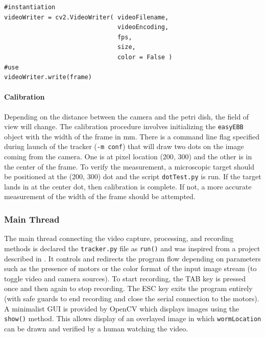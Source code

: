 \documentclass[main.tex]{subfiles}
\begin{document}
\begin{lstlisting}
#instantiation
videoWriter = cv2.VideoWriter( videoFilename, 
                               videoEncoding, 
                               fps, 
                               size, 
                               color = False )
#use
videoWriter.write(frame)
\end{lstlisting}

\paragraph{Calibration}
Depending on the distance between the camera and the petri dish, the field of view will change. The calibration procedure involves initializing the \verb|easyEBB| object with the width of the frame in mm. There is a command line flag specified during launch of the tracker (\verb|-m conf|) that will draw two dots on the image coming from the camera. One is at pixel location (200, 300) and the other is in the center of the frame. To verify the measurement, a microscopic target should be positioned at the (200, 300) dot and the script \verb|dotTest.py| is run. If the target lands in at the center dot, then calibration is complete. If not, a more accurate measurement of the width of the frame should be attempted. 


\subsubsection{Main Thread}
The main thread connecting the video capture, processing, and recording methods is declared the \verb|tracker.py| file as \verb|run()| and was inspired from a project described in \cite{OpenCVPython}. It controls and redirects the program flow depending on parameters such as the presence of motors or the color format of the input image stream (to toggle video and camera sources). To start recording, the TAB key is pressed once and then again to stop recording. The ESC key exits the program entirely (with safe guards to end recording and close the serial connection to the motors). A minimalist GUI is provided by OpenCV which displays images using the \verb|show()| method. This allows display of an overlayed image in which \verb|wormLocation| can be drawn and verified by a human watching the video. 
\end{document}
